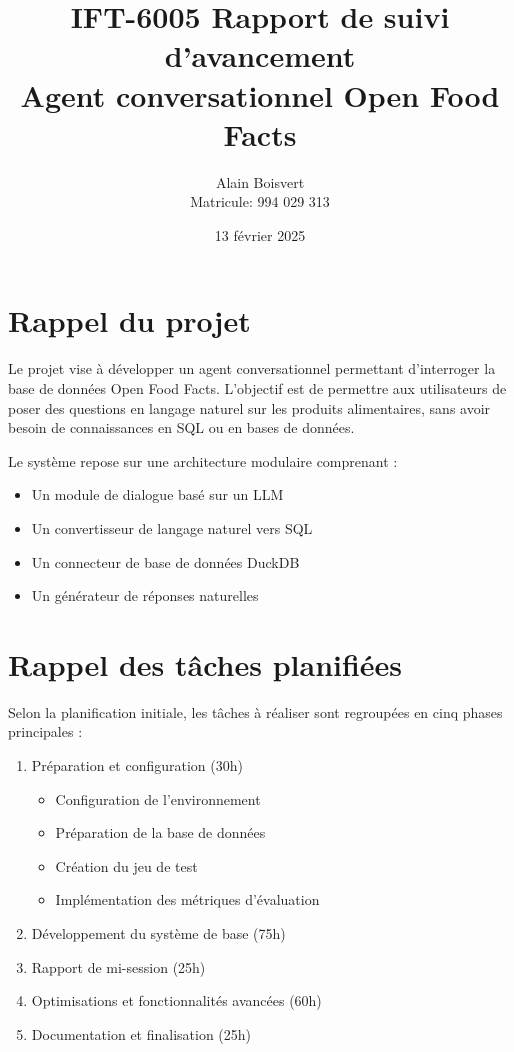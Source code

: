 \documentclass[12pt]{article}
\title{IFT-6005 Rapport de suivi d'avancement\\Agent conversationnel Open Food Facts}
\author{Alain Boisvert\\
Matricule: 994 029 313}
\date{13 février 2025}
\begin{document}
\maketitle

\section{Rappel du projet}

Le projet vise à développer un agent conversationnel permettant d'interroger la base de données Open Food Facts. L'objectif est de permettre aux utilisateurs de poser des questions en langage naturel sur les produits alimentaires, sans avoir besoin de connaissances en SQL ou en bases de données.

Le système repose sur une architecture modulaire comprenant :
\begin{itemize}
    \item Un module de dialogue basé sur un LLM
    \item Un convertisseur de langage naturel vers SQL
    \item Un connecteur de base de données DuckDB
    \item Un générateur de réponses naturelles
\end{itemize}

\section{Rappel des tâches planifiées}

Selon la planification initiale, les tâches à réaliser sont regroupées en cinq phases principales :

\begin{enumerate}
    \item Préparation et configuration (30h)
    \begin{itemize}
        \item Configuration de l'environnement
        \item Préparation de la base de données
        \item Création du jeu de test
        \item Implémentation des métriques d'évaluation
    \end{itemize}

    \item Développement du système de base (75h)
    \item Rapport de mi-session (25h)
    \item Optimisations et fonctionnalités avancées (60h)
    \item Documentation et finalisation (25h)
\end{enumerate}
\end{document}
